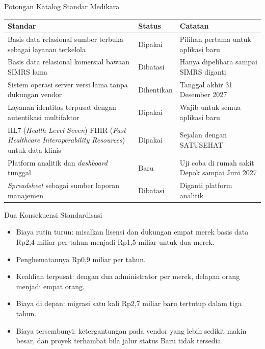 \documentclass[aspectratio=169, table, 12pt]{beamer}
\begin{document}
\begin{frame}{{\Large Potongan Katalog Standar Medikara}}
  \scriptsize
  \begin{tabularx}{\textwidth}{Yl Y}
    \hline
    \textbf{Standar} & \textbf{Status} & \textbf{Catatan} \\
    \hline
    Basis data relasional sumber terbuka sebagai layanan terkelola & Dipakai & Pilihan pertama untuk aplikasi baru \\
    \hline
    Basis data relasional komersial bawaan SIMRS lama & Dibatasi & Hanya dipelihara sampai SIMRS diganti \\
    \hline
    Sistem operasi server versi lama tanpa dukungan vendor & Dihentikan & Tanggal akhir 31 Desember 2027 \\
    \hline
    Layanan identitas terpusat dengan autentikasi multifaktor & Dipakai & Wajib untuk semua aplikasi baru \\
    \hline
    HL7 (\textit{Health Level Seven}) FHIR (\textit{Fast Healthcare Interoperability Resources}) untuk data klinis & Dipakai & Sejalan dengan SATUSEHAT \\
    \hline
    Platform analitik dan \textit{dashboard} tunggal & Baru & Uji coba di rumah sakit Depok sampai Juni 2027 \\
    \hline
    \textit{Spreadsheet} sebagai sumber laporan manajemen & Dibatasi & Diganti platform analitik \\
    \hline
  \end{tabularx}
\end{frame}

\begin{frame}{{\Large Dua Konsekuensi Standardisasi}}
  \small
  \vspace{6pt}
  \begin{itemize}
    \item Biaya rutin turun: misalkan lisensi dan dukungan empat merek basis data Rp2,4 miliar per
          tahun menjadi Rp1,5 miliar untuk dua merek.
    \item Penghematannya Rp0,9 miliar per tahun.
    \item Keahlian terpusat: dengan dua administrator per merek, delapan orang menjadi empat orang.
    \item Biaya di depan: migrasi satu kali Rp2,7 miliar baru tertutup dalam tiga tahun.
    \item Biaya tersembunyi: ketergantungan pada vendor yang lebih sedikit makin besar, dan proyek
          terhambat bila jalur status Baru tidak tersedia.
  \end{itemize}
\end{frame}
\end{document}
